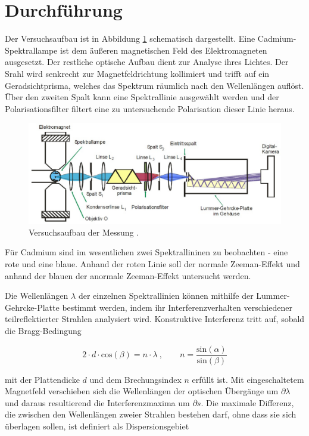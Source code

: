 \section{Durchführung}
\label{sec:Durchführung}

Der Versuchsaufbau ist in Abbildung \ref{fig:aufbau} schematisch dargestellt.
Eine Cadmium-Spektrallampe ist dem äußeren magnetischen Feld des Elektromagneten ausgesetzt.
Der restliche optische Aufbau dient zur Analyse ihres Lichtes. Der Srahl wird senkrecht zur
Magnetfeldrichtung kollimiert und trifft
auf ein Geradsichtprisma, welches das Spektrum räumlich nach den Wellenlängen auflöst.
Über den zweiten Spalt kann eine Spektrallinie ausgewählt werden und der Polarisationsfilter
filtert eine zu untersuchende Polarisation dieser Linie heraus.

\vspace{-5pt}
\begin{figure}[H]
    \centering
    \includegraphics[scale=0.3]{content/aufbau.png}
    \caption{Versuchsaufbau der Messung \cite{alt}.}
    \label{fig:aufbau}
\end{figure}

Für Cadmium sind im wesentlichen zwei Spektrallininen zu beobachten - eine rote und eine blaue.
Anhand der roten Linie soll der normale Zeeman-Effekt und anhand der blauen der anormale 
Zeeman-Effekt untersucht werden. 

Die Wellenlängen $\lambda$ der einzelnen Spektrallinien können mithilfe der Lummer-Gehrcke-Platte 
bestimmt werden, indem ihr Interferenzverhalten verschiedener teilreflektierter Strahlen
analysiert wird. Konstruktive Interferenz tritt auf, sobald die Bragg-Bedingung

\begin{equation}
    2 \cdot d \cdot \text{cos}(\beta) = n \cdot \lambda \: , 
    \qquad n = \frac{\text{sin}(\alpha)}{\text{sin}(\beta)}
\end{equation}

mit der Plattendicke $d$ und dem Brechungsindex $n$ erfüllt ist.
Mit eingeschaltetem Magnetfeld verschieben sich die Wellenlängen der 
optischen Übergänge um $\partial \lambda$ und daraus resultierend
die Interferenzmaxima um $\partial s$.
Die maximale Differenz, die zwischen den Wellenlängen zweier Strahlen bestehen darf,
ohne dass sie sich überlagen sollen, ist definiert als Dispersionsgebiet

